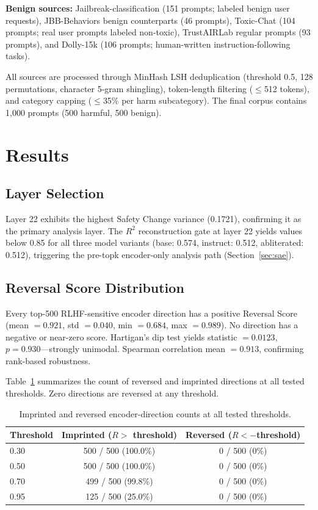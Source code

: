 \documentclass[11pt,letterpaper]{article}
\begin{document}
\noindent\textbf{Benign sources:} Jailbreak-classification (151 prompts; labeled benign user
requests), JBB-Behaviors benign counterparts \citep{Chao2024} (46 prompts), Toxic-Chat (104 prompts;
real user prompts labeled non-toxic), TrustAIRLab regular prompts (93 prompts), and Dolly-15k
\citep{Conover2023} (106 prompts; human-written instruction-following tasks).

All sources are processed through MinHash LSH deduplication (threshold 0.5, 128 permutations,
character 5-gram shingling), token-length filtering ($\leq$512 tokens), and category capping
($\leq$35\% per harm subcategory). The final corpus contains 1,000 prompts (500 harmful, 500 benign).

\section{Results}

\subsection{Layer Selection}
\label{sec:layers}

Layer 22 exhibits the highest Safety Change variance (0.1721), confirming it as the primary analysis
layer. The $R^2$ reconstruction gate at layer 22 yields values below 0.85 for all three model
variants (base: 0.574, instruct: 0.512, abliterated: 0.512), triggering the pre-topk encoder-only
analysis path (Section~\ref{sec:sae}).

\subsection{Reversal Score Distribution}
\label{sec:reversal}

Every top-500 RLHF-sensitive encoder direction has a positive Reversal Score
(mean $= 0.921$, std $= 0.040$, min $= 0.684$, max $= 0.989$). No direction has a negative or
near-zero score. Hartigan's dip test yields statistic $= 0.0123$, $p = 0.930$---strongly unimodal.
Spearman correlation mean $= 0.913$, confirming rank-based robustness.

Table~\ref{tab:reversal} summarizes the count of reversed and imprinted directions at all tested
thresholds. Zero directions are reversed at any threshold.

\begin{table}[!htbp]
  \centering
  \caption{Imprinted and reversed encoder-direction counts at all tested thresholds.}
  \label{tab:reversal}
  \begin{tabular}{lcc}
    \toprule
    Threshold & Imprinted ($R >$ threshold) & Reversed ($R < -$threshold) \\
    \midrule
    0.30 & 500 / 500 (100.0\%) & 0 / 500 (0\%) \\
    0.50 & 500 / 500 (100.0\%) & 0 / 500 (0\%) \\
    0.70 & 499 / 500 (99.8\%)  & 0 / 500 (0\%) \\
    0.95 & 125 / 500 (25.0\%)  & 0 / 500 (0\%) \\
    \bottomrule
  \end{tabular}
\end{table}
\end{document}
